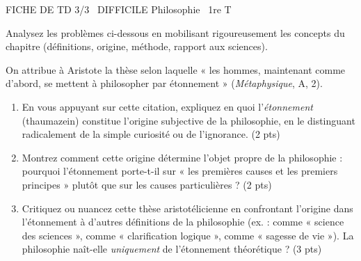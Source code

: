 \documentclass[11pt]{article}
\begin{document}
\begin{tcolorbox}[enhanced,colback=popink,colframe=popink,arc=10pt,boxrule=0pt,left=12pt,right=12pt,top=9pt,bottom=9pt]
{\color{white}\popxbold\small FICHE DE TD 3/3 \textbullet\ DIFFICILE \hfill Philosophie \textbullet\ 1re T\par}
\end{tcolorbox}
\vspace{4pt}
Analysez les problèmes ci-dessous en mobilisant rigoureusement les concepts du chapitre (définitions, origine, méthode, rapport aux sciences).

\begin{exercice}
On attribue à Aristote la thèse selon laquelle « les hommes, maintenant comme d'abord, se mettent à philosopher par étonnement » (\textit{Métaphysique}, A, 2). 
\begin{enumerate}
    \item En vous appuyant sur cette citation, expliquez en quoi l'\textit{étonnement} (thaumazein) constitue l'origine subjective de la philosophie, en le distinguant radicalement de la simple curiosité ou de l'ignorance. (2 pts)
    \item Montrez comment cette origine détermine l'objet propre de la philosophie : pourquoi l'étonnement porte-t-il sur « les premières causes et les premiers principes » plutôt que sur les causes particulières ? (2 pts)
    \item Critiquez ou nuancez cette thèse aristotélicienne en confrontant l'origine dans l'étonnement à d'autres définitions de la philosophie (ex. : comme « science des sciences », comme « clarification logique », comme « sagesse de vie »). La philosophie naît-elle \textit{uniquement} de l'étonnement théorétique ? (3 pts)
\end{enumerate}
\end{exercice}
\end{document}
